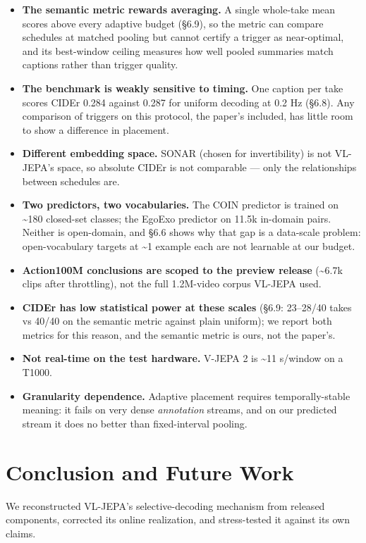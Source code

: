 \begin{itemize}
\item \textbf{The semantic metric rewards averaging.} A single whole-take mean scores above every adaptive budget (\S6.9), so the metric can compare schedules at matched pooling but cannot certify a trigger as near-optimal, and its best-window ceiling measures how well pooled summaries match captions rather than trigger quality.
\item \textbf{The benchmark is weakly sensitive to timing.} One caption per take scores CIDEr 0.284 against 0.287 for uniform decoding at 0.2 Hz (\S6.8). Any comparison of triggers on this protocol, the paper's included, has little room to show a difference in placement.
\item \textbf{Different embedding space.} SONAR (chosen for invertibility) is not VL-JEPA's space, so absolute CIDEr is not comparable --- only the relationships between schedules are.
\item \textbf{Two predictors, two vocabularies.} The COIN predictor is trained on \textasciitilde{}180 closed-set classes; the EgoExo predictor on 11.5k in-domain pairs. Neither is open-domain, and \S6.6 shows why that gap is a data-scale problem: open-vocabulary targets at \textasciitilde{}1 example each are not learnable at our budget.
\item \textbf{Action100M conclusions are scoped to the preview release} (\textasciitilde{}6.7k clips after throttling), not the full 1.2M-video corpus VL-JEPA used.
\item \textbf{CIDEr has low statistical power at these scales} (\S6.9: 23--28/40 takes vs 40/40 on the semantic metric against plain uniform); we report both metrics for this reason, and the semantic metric is ours, not the paper's.
\item \textbf{Not real-time on the test hardware.} V-JEPA 2 is \textasciitilde{}11 s/window on a T1000.
\item \textbf{Granularity dependence.} Adaptive placement requires temporally-stable meaning: it fails on very dense \emph{annotation} streams, and on our predicted stream it does no better than fixed-interval pooling.
\end{itemize}

\medskip

\section{Conclusion and Future Work}

We reconstructed VL-JEPA's selective-decoding mechanism from released components, corrected its online realization, and stress-tested it against its own claims.

